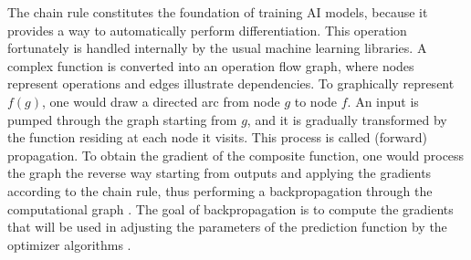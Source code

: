 \par The chain rule constitutes the foundation of training AI models, because it provides a way to automatically perform differentiation. This operation fortunately is handled internally by the usual machine learning libraries. A complex function is converted into an operation flow graph, where nodes represent operations and edges illustrate dependencies. To graphically represent $f(g)$, one would draw a directed arc from node $g$ to node $f$. An input is pumped through the graph starting from $g$, and it is gradually transformed by the function residing at each node it visits. This process is called (forward) propagation. To obtain the gradient of the composite function, one would process the graph the reverse way starting from outputs and applying the gradients according to the chain rule, thus performing a backpropagation through the computational graph \cite{D2l}. The goal of backpropagation is to compute the gradients that will be used in adjusting the parameters of the prediction function by the optimizer algorithms \cite{damadi2023backpropagation}.


